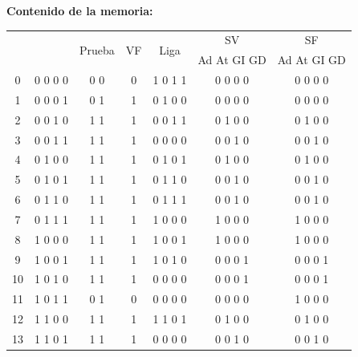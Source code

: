 \documentclass[12pt]{article}
\begin{document}
\textbf{Contenido de la memoria:}\\

\begin{center}
	\begin{tabular}{|c|c|c|c|c|c|c|}
		\hline 
		\multicolumn{2}{|c|}{ \multirow{2}{*}{Estado}} & \multirow{2}{*}{Prueba} & \multirow{2}{*}{VF} & \multirow{2}{*}{Liga} & SV & SF \\ 
		\cline{6-7}
		 \multicolumn{2}{|c|}{}& & & &Ad At GI GD & Ad At GI GD \\ 
		\hline 
		0   & 0 0 0 0 & 0 0 & 0 & 1 0 1 1 & 0 0 0 0 & 0 0 0 0\\ 
		\hline                                               
		1   & 0 0 0 1 & 0 1 & 1 & 0 1 0 0 & 0 0 0 0 & 0 0 0 0\\ 
		\hline                                               
		2   & 0 0 1 0 & 1 1 & 1 & 0 0 1 1 & 0 1 0 0 & 0 1 0 0\\ 
		\hline                                               
		3   & 0 0 1 1 & 1 1 & 1 & 0 0 0 0 & 0 0 1 0 & 0 0 1 0\\ 
		\hline                                               
		4   & 0 1 0 0 & 1 1 & 1 & 0 1 0 1 & 0 1 0 0 & 0 1 0 0\\ 
		\hline                                               
		5   & 0 1 0 1 & 1 1 & 1 & 0 1 1 0 & 0 0 1 0 & 0 0 1 0\\ 
		\hline                                               
		6   & 0 1 1 0 & 1 1 & 1 & 0 1 1 1 & 0 0 1 0 & 0 0 1 0\\ 
		\hline                                               
		7   & 0 1 1 1 & 1 1 & 1 & 1 0 0 0 & 1 0 0 0 & 1 0 0 0\\ 
		\hline                                               
		8   & 1 0 0 0 & 1 1 & 1 & 1 0 0 1 & 1 0 0 0 & 1 0 0 0\\ 
		\hline                                               
		9   & 1 0 0 1 & 1 1 & 1 & 1 0 1 0 & 0 0 0 1 & 0 0 0 1\\ 
		\hline                                               
		10  & 1 0 1 0 & 1 1 & 1 & 0 0 0 0 & 0 0 0 1 & 0 0 0 1\\ 
		\hline                                               
		11  & 1 0 1 1 & 0 1 & 0 & 0 0 0 0 & 0 0 0 0 & 1 0 0 0\\ 
		\hline                                               
		12  & 1 1 0 0 & 1 1 & 1 & 1 1 0 1 & 0 1 0 0 & 0 1 0 0\\ 
		\hline                                               
		13  & 1 1 0 1 & 1 1 & 1 & 0 0 0 0 & 0 0 1 0 & 0 0 1 0\\ 
		\hline 
	\end{tabular} 
\end{center}
\end{document}
